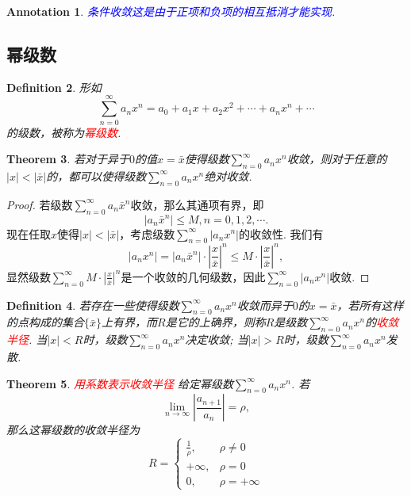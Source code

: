 \documentclass{article}
\newtheorem{theorem}{Theorem}[section]
\newtheorem{definition}[theorem]{Definition}
\newtheorem{annotation}[theorem]{Annotation}
\newcommand{\redt}[1]{\textcolor{red}{#1}}
\newcommand{\bluet}[1]{\textcolor{blue}{#1}}
\begin{document}
\begin{annotation}
\rm \bluet{条件收敛这是由于正项和负项的相互抵消才能实现}. 
\end{annotation}

\subsection{幂级数}

\begin{definition}
\rm 形如
$$
\sum\limits_{n=0}^{\infty}a_nx^n =  a_0 + a_1x+ a_2x^2 + \cdots + a_nx^n + \cdots
$$
的级数，被称为\redt{幂级数}.
\end{definition}

\begin{theorem}
\rm 若对于异于$0$的值$x=\bar{x}$使得级数$\sum\limits_{n=0}^{\infty}a_nx^n$收敛，则对于任意的$|x| < |\bar{x}|$的，都可以使得级数$\sum\limits_{n=0}^{\infty}a_nx^n$绝对收敛.
\end{theorem}

\begin{proof}
若级数$\sum\limits_{n=0}^{\infty}a_n\bar{x}^n$收敛，那么其通项有界，即
$$
|a_n\bar{x}^n| \leq M, n = 0,1,2,\cdots.
$$
现在任取$x$使得$|x| < |\bar{x}|$，考虑级数$\sum\limits_{n=0}^{\infty}|a_nx^n|$的收敛性. 我们有
$$
|a_nx^n| = |a_n\bar{x}^n|\cdot \left|\frac{x}{\bar{x}}\right|^n \leq M\cdot\left|\frac{x}{\bar{x}}\right|^n,
$$
显然级数$\sum\limits_{n=0}^{\infty} M\cdot\left|\frac{x}{\bar{x}}\right|^n$是一个收敛的几何级数，因此$\sum\limits_{n=0}^{\infty}|a_nx^n|$收敛. 
\end{proof}


\begin{definition}
\rm 若存在一些使得级数$\sum\limits_{n=0}^{\infty}a_nx^n$收敛而异于$0$的$x = \bar{x}$，若所有这样的点构成的集合$\{\bar{x}\}$上有界，而$R$是它的上确界，则称$R$是级数$\sum\limits_{n=0}^{\infty}a_nx^n$的\redt{收敛半径}. 当$|x| < R$时，级数$\sum\limits_{n=0}^{\infty}a_nx^n$决定收敛; 当$|x| > R$时，级数$\sum\limits_{n=0}^{\infty}a_nx^n$发散. 
\end{definition}

\begin{theorem}
\rm \redt{用系数表示收敛半径} 给定幂级数$\sum\limits_{n=0}^{\infty}a_nx^n$. 若
$$
\lim\limits_{n \to \infty} \left|\frac{a_{n+1}}{a_n}\right| = \rho,
$$
那么这幂级数的收敛半径为
$$
R = \left\{ \begin{array}{ll}
\frac{1}{\rho}, & \rho \neq 0 \\
+\infty, & \rho = 0 \\
0, & \rho = +\infty
\end{array}\right.
$$
\end{theorem}
\end{document}
